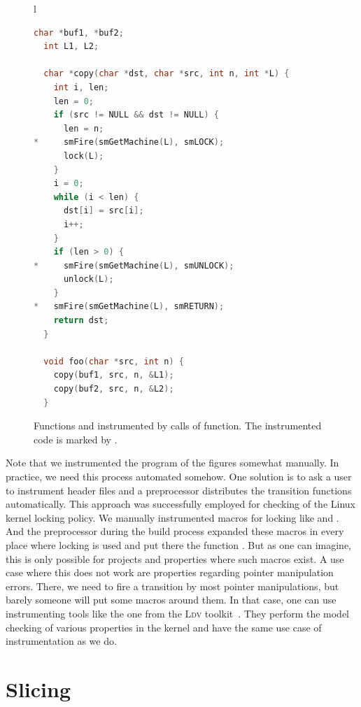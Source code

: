 \begin{figure}[tb]
    \begin{center}
    \begin{tabular}{l}
    \begin{lstlisting}[language=C]
  char *buf1, *buf2;
  int L1, L2;

  char *copy(char *dst, char *src, int n, int *L) {
    int i, len;
    len = 0;
    if (src != NULL && dst != NULL) {
      len = n;
*     smFire(smGetMachine(L), smLOCK);
      lock(L);
    }
    i = 0;
    while (i < len) {
      dst[i] = src[i];
      i++;
    }
    if (len > 0) {
*     smFire(smGetMachine(L), smUNLOCK);
      unlock(L);
    }
*   smFire(smGetMachine(L), smRETURN);
    return dst;
  }

  void foo(char *src, int n) {
    copy(buf1, src, n, &L1);
    copy(buf2, src, n, &L2);
  }
    \end{lstlisting}
    \end{tabular}
    \end{center}
    \caption{Functions  and  instrumented by calls
      of  function. The instrumented code is marked by \code{*}.}
    \label{fig:copy_instrumented}
\end{figure}

Note that we instrumented the program of the figures somewhat manually. In
practice, we need this process automated somehow. One solution is to ask a
user to instrument header files and a preprocessor distributes the transition
functions automatically. This approach was successfully employed for checking
of the Linux kernel locking policy. We manually instrumented macros for
locking like  and . And the preprocessor
during the build process expanded these macros in every place where locking is
used and put there the function . But as one can imagine, this is
only possible for projects and properties where such macros exist. A use case
where this does not work are properties regarding pointer manipulation errors.
There, we need to fire a transition by most pointer manipulations, but barely
someone will put some macros around them. In that case, one can use
instrumenting tools like the one from the \textsc{Ldv} toolkit~\cite{ldv}.
They perform the model checking of various properties in the kernel and have
the same use case of instrumentation as we do.


\section{Slicing} \label{sec:fmics_slicing}

